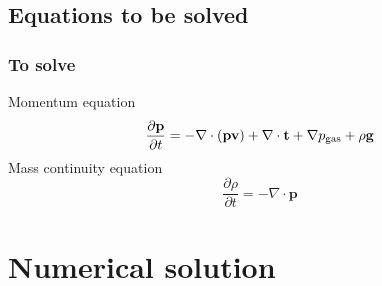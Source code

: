 \documentclass{beamer}
\newcommand{\del}{\ensuremath{\nabla}}
\begin{document}
\subsection{Equations to be solved}

\begin{frame}
    \frametitle{To solve}

    Momentum equation
    \begin{equation}
        \frac{\partial \mathbf{p}}{\partial t} = - \del \cdot \left( \mathbf{p} \mathbf{v} \right) + \del \cdot \mathbf{t} + \del p_{\rm gas} + \rho \mathbf{g}
        \label{eq:momentum}
    \end{equation}
    Mass continuity equation
    \begin{equation}
        \frac{\partial \rho}{\partial t} = - \del \cdot \mathbf{p}
        \label{eq:density}
    \end{equation}

\end{frame}

\section{Numerical solution}
\end{document}
